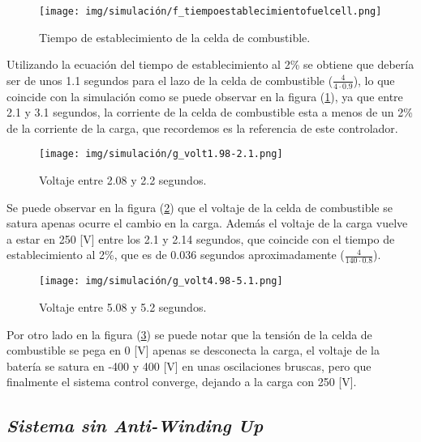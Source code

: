 \begin{figure}[H]
    \centering
    \texttt{[image: img/simulación/f\_tiempoestablecimientofuelcell.png]}
    \caption{Tiempo de establecimiento de la celda de combustible.}
    \label{fig:f_tiempoestablecimientofuelcell}
\end{figure}

Utilizando la ecuación del tiempo de establecimiento al 2\% se obtiene que debería ser de unos
1.1 segundos para el lazo de la celda de combustible ($\frac{4}{4\cdot0.9}$), lo que coincide con la simulación
como se puede observar en la figura (\ref{fig:f_tiempoestablecimientofuelcell}), ya que entre 
2.1 y 3.1 segundos, la corriente de la celda de combustible esta a menos de un 2\% de la corriente de la 
carga, que recordemos es la referencia de este controlador.


\begin{figure}[H]
    \centering
    \texttt{[image: img/simulación/g\_volt1.98-2.1.png]}
    \caption{Voltaje entre 2.08 y 2.2 segundos.}
    \label{fig:g_volt1.98-2.1}
\end{figure}

Se puede observar en la figura (\ref{fig:g_volt1.98-2.1}) que el voltaje de la celda de 
combustible se satura apenas ocurre el cambio en la carga. Además el voltaje de la carga
vuelve a estar en 250 [V] entre los 2.1 y 2.14 segundos, que coincide con el tiempo de
establecimiento al 2\%, que es de 0.036 segundos aproximadamente ($\frac{4}{140\cdot0.8}$).

\begin{figure}[H]
    \centering
    \texttt{[image: img/simulación/g\_volt4.98-5.1.png]}
    \caption{Voltaje entre 5.08 y 5.2 segundos.}
    \label{fig:g_volt4.98-5.1}
\end{figure}

Por otro lado en la figura (\ref{fig:g_volt4.98-5.1}) se puede notar que la tensión de la 
celda de combustible se pega en 0 [V] apenas se desconecta la carga, el voltaje de la batería
se satura en -400 y 400 [V] en unas oscilaciones bruscas, pero que finalmente el sistema
control converge, dejando a la carga con 250 [V].

\subsection{\textit{Sistema sin Anti-Winding Up}}

